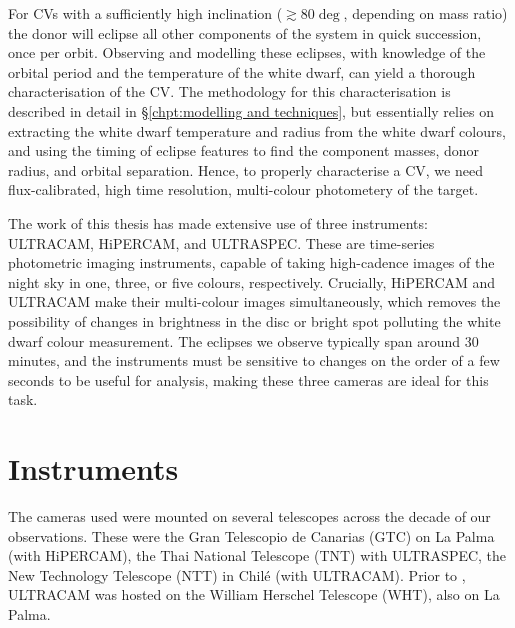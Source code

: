 
\label{chpt:observations and observational techniques} %



For CVs with a sufficiently high inclination ($\gtrsim 80 \deg$, depending on mass ratio) the donor will eclipse all other components of the system in quick succession, once per orbit. Observing and modelling these eclipses, with knowledge of the orbital period and the temperature of the white dwarf, can yield a thorough characterisation of the CV. The methodology for this characterisation is described in detail in \S\ref{chpt:modelling and techniques}, but essentially relies on extracting the white dwarf temperature and radius from the white dwarf colours, and using the timing of eclipse features to find the component masses, donor radius, and orbital separation. Hence, to properly characterise a CV, we need flux-calibrated, high time resolution, multi-colour photometery of the target. 

The work of this thesis has made extensive use of three instruments: ULTRACAM, HiPERCAM, and ULTRASPEC.
These are time-series photometric imaging instruments, capable of taking high-cadence images of the night sky in one, three, or five colours, respectively. Crucially, HiPERCAM and ULTRACAM make their multi-colour images simultaneously, which removes the possibility of changes in brightness in the disc or bright spot polluting the white dwarf colour measurement. The eclipses we observe typically span around 30 minutes, and the instruments must be sensitive to changes on the order of a few seconds to be useful for analysis, making these three cameras are ideal for this task.


\section{Instruments}

The cameras used were mounted on several telescopes across the decade of our observations. These were the Gran Telescopio de Canarias (GTC) on La Palma (with HiPERCAM), the Thai National Telescope (TNT) with ULTRASPEC, the New Technology Telescope (NTT) in Chil\'e (with ULTRACAM). Prior to , ULTRACAM was hosted on the William Herschel Telescope (WHT), also on La Palma. 


